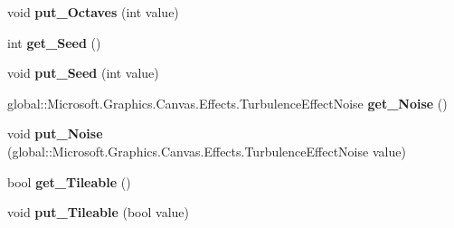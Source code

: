 \begin{DoxyCompactItemize}
\item 
\mbox{\label{interface_microsoft_1_1_graphics_1_1_canvas_1_1_effects_1_1_i_turbulence_effect_a48a62385daa2689c9cb13482c43c3513}} 
void {\bfseries put\+\_\+\+Octaves} (int value)
\item 
\mbox{\label{interface_microsoft_1_1_graphics_1_1_canvas_1_1_effects_1_1_i_turbulence_effect_af5fd3f6139436ae5a010c68ce7ab071f}} 
int {\bfseries get\+\_\+\+Seed} ()
\item 
\mbox{\label{interface_microsoft_1_1_graphics_1_1_canvas_1_1_effects_1_1_i_turbulence_effect_a5c5d935930cc55a72aa9a22ade2046dd}} 
void {\bfseries put\+\_\+\+Seed} (int value)
\item 
\mbox{\label{interface_microsoft_1_1_graphics_1_1_canvas_1_1_effects_1_1_i_turbulence_effect_a0607d51d4941f076f4fd0bd3491f5589}} 
global\+::\+Microsoft.\+Graphics.\+Canvas.\+Effects.\+Turbulence\+Effect\+Noise {\bfseries get\+\_\+\+Noise} ()
\item 
\mbox{\label{interface_microsoft_1_1_graphics_1_1_canvas_1_1_effects_1_1_i_turbulence_effect_af647617d63b69c0e66e204d3dbc35129}} 
void {\bfseries put\+\_\+\+Noise} (global\+::\+Microsoft.\+Graphics.\+Canvas.\+Effects.\+Turbulence\+Effect\+Noise value)
\item 
\mbox{\label{interface_microsoft_1_1_graphics_1_1_canvas_1_1_effects_1_1_i_turbulence_effect_a60dd710286094ffebd50bbf6cbcb9ccd}} 
bool {\bfseries get\+\_\+\+Tileable} ()
\item 
\mbox{\label{interface_microsoft_1_1_graphics_1_1_canvas_1_1_effects_1_1_i_turbulence_effect_a16632357dcc2d4e3e5ab07c3eda97095}} 
void {\bfseries put\+\_\+\+Tileable} (bool value)
\item 

\end{DoxyCompactItemize}
